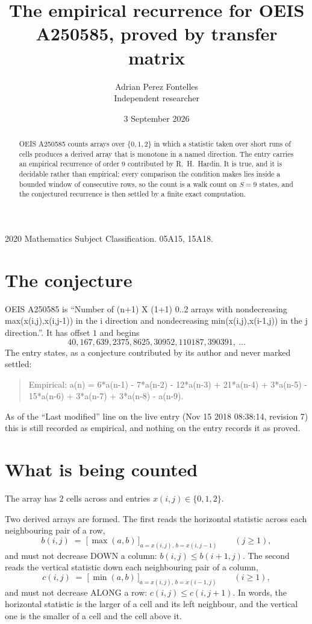 \documentclass[11pt,a4paper]{article}
\title{The empirical recurrence for OEIS A250585, proved by transfer matrix}
\author{Adrian Perez Fontelles\\ \small Independent researcher}
\date{3 September 2026}
\theoremstyle{plain}
\theoremstyle{definition}
\begin{document}
\maketitle

\begin{abstract}
OEIS A250585 counts arrays over $\{0,1,2\}$ in which a statistic taken over short runs
of cells produces a derived array that is monotone in a named direction. The entry carries an
empirical recurrence of order $9$ contributed by R.~H.~Hardin. It is true, and it is
decidable rather than empirical: every comparison the condition makes lies inside a bounded
window of consecutive rows, so the count is a walk count on $S=9$ states, and the
conjectured recurrence is then settled by a finite exact computation.
\end{abstract}

\noindent\small 2020 Mathematics Subject Classification. 05A15, 15A18.\normalsize

\section{The conjecture}

OEIS A250585 is ``Number of (n+1) X (1+1) 0..2 arrays with nondecreasing max(x(i,j),x(i,j-1)) in the i direction and nondecreasing min(x(i,j),x(i-1,j)) in the j direction.''. It has offset $1$ and begins
\[
40, 167, 639, 2375, 8625, 30952, 110187, 390391,\ \dots
\]
The entry states, as a conjecture contributed by its author and never marked settled:
\begin{quote}
Empirical: a(n) = 6*a(n-1) - 7*a(n-2) - 12*a(n-3) + 21*a(n-4) + 3*a(n-5) - 15*a(n-6) + 3*a(n-7) + 3*a(n-8) - a(n-9).
\end{quote}
As of the ``Last modified'' line on the live entry (Nov 15 2018 08:38:14, revision 7) this is still
recorded as empirical, and nothing on the entry records it as proved.

\section{What is being counted}

The array has $2$ cells across and entries $x(i,j)\in\{0,1,2\}$.

Two derived arrays are formed. The first reads the horizontal statistic across each
neighbouring pair of a row,
\[
b(i,j)\;=\;\bigl[\,\max(a,b)\,\bigr]_{a=x(i,j),\,b=x(i,j-1)}\qquad (j\ge1),
\]
and must not decrease DOWN a column: $b(i,j)\le b(i{+}1,j)$. The second reads the vertical
statistic down each neighbouring pair of a column,
\[
c(i,j)\;=\;\bigl[\,\min(a,b)\,\bigr]_{a=x(i,j),\,b=x(i{-}1,j)}\qquad (i\ge1),
\]
and must not decrease ALONG a row: $c(i,j)\le c(i,j{+}1)$. In words, the horizontal statistic
is the larger of a cell and its left neighbour, and the vertical one is
the smaller of a cell and the cell above it.
\end{document}
